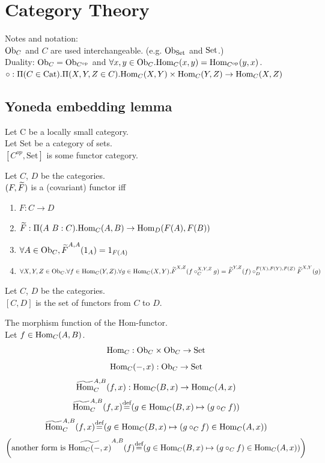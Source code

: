 \documentclass[10pt,a4paper]{article}
\begin{document}
\section{Category Theory}
Notes and notation:\\
${\textrm{Ob}}_C$ and $C$ are used interchangeable. (e.g. ${\textrm{Ob}}_{\textrm{Set}}$ and ${\textrm{Set}}$.)\\
Duality: ${\textrm{Ob}}_C = {\textrm{Ob}}_{C^{\textrm{op}}}$ and 
 $\forall x,y \in {\textrm{Ob}}_C. {\textrm{Hom}}_C(x,y) = {\textrm{Hom}}_{C^{\textrm{op}}}(y,x)$.\\
$\circ : \Pi(C\in {\textrm{Cat}}).\Pi(X,Y,Z\in C).{\textrm{Hom}}_C(X,Y)\times{\textrm{Hom}}_C(Y,Z)\to{\textrm{Hom}}_C(X,Z)$

\subsection{Yoneda embedding lemma}
Let C be a locally small category.\\
Let Set be a category of sets.\\
$[C^{op},\textrm{Set}]$ is some functor category.\\

\begin{definition}
Let $C$, $D$ be the categories.\\
 $(F, {\widetilde{F}\textrm{}})$ is a (covariant) functor iff\\
\begin{enumerate}
\item $F:C \to D$
\item ${\widetilde{F}\textrm{}}:\Pi(A\ B:C).{\textrm{Hom}}_C(A,B) \to {\textrm{Hom}}_D(F(A), F(B))$
\item $\forall A\in {\textrm{Ob}}_C, {\widetilde{F}\textrm{}}^{A,A}(1_A)=1_{F(A)}$
\item $\forall X,Y,Z \in {\textrm{Ob}}_C.\forall f\in{\textrm{Hom}}_C(Y,Z).\forall g\in{\textrm{Hom}}_C(X,Y). {\widetilde{F}\textrm{}}^{X,Z}(f\circ_C^{X,Y,Z} g)={\widetilde{F}\textrm{}}^{Y,Z}(f)\circ_D^{F(X),F(Y),F(Z)} {\widetilde{F}\textrm{}}^{X,Y}(g)$
\end{enumerate}

\end{definition}

\begin{definition}
Let $C$, $D$ be the categories.\\
$[C,D]$ is the set of functors from $C$ to $D$.\\
\end{definition}

\begin{definition} The morphism function of the Hom-functor.\\
Let $f\in{\textrm{Hom}}_{C}(A,B)$.
$${\textrm{Hom}}_C: {\textrm{Ob}}_C \times {\textrm{Ob}}_C \to {\textrm{Set}}$$
$${\textrm{Hom}}_C(-,x): {\textrm{Ob}}_C \to {\textrm{Set}}$$
$${\widetilde{{\textrm{Hom}}}\textrm{}}^{A,B}_C(f,x) : {\textrm{Hom}}_C(B,x) \to {\textrm{Hom}}_C(A,x)$$
$${\widetilde{{\textrm{Hom}}}\textrm{}}^{A,B}_C(f,x) {\stackrel{{\textrm{def}}}{=}} (g \in{\textrm{Hom}}_C(B,x) \mapsto (g \circ_C f))$$
$${\widetilde{{\textrm{Hom}}}\textrm{}}^{A,B}_C(f,x) {\stackrel{{\textrm{def}}}{=}} (g \in{\textrm{Hom}}_C(B,x) \mapsto (g \circ_C f) \in{\textrm{Hom}}_C(A,x))$$
$$\left(\textrm{another form is }\widetilde{{\textrm{Hom}}_C(-,x)}^{A,B}(f) {\stackrel{{\textrm{def}}}{=}} (g \in{\textrm{Hom}}_C(B,x) \mapsto (g \circ_C f) \in{\textrm{Hom}}_C(A,x))\right)$$
\end{definition}
\end{document}
